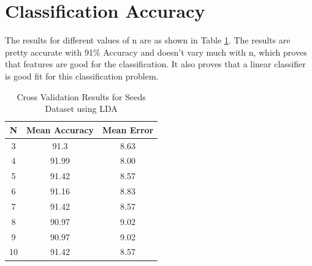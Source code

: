 \documentclass[11pt, pdftex]{article}
\begin{document}
\section{Classification Accuracy}
The results for different values of n are as shown in Table \ref{tab:seeds}. The results are pretty accurate with 91$\%$ Accuracy and doesn't vary much with n, which proves that features are good for the classification. It also proves that a linear classifier is good fit for this classification problem.
\begin{table}
\centering
\begin{tabular}{ | c | c | c |}
    \hline
    {\bf N} & {\bf Mean Accuracy} & {\bf Mean Error}\\ 
    \hline
    3 & 91.3 & 8.63\\
	\hline
	4 & 91.99 & 8.00\\
	\hline
	5 & 91.42 & 8.57\\
	\hline
	6 & 91.16 & 8.83\\
	\hline
	7 & 91.42 & 8.57\\
	\hline
	8 & 90.97 & 9.02\\
	\hline
	9 & 90.97 & 9.02\\
	\hline
	10 & 91.42 & 8.57\\
	\hline
	\end{tabular}
	\caption{Cross Validation Results for Seeds Dataset using LDA}
    \label{tab:seeds}
\end{table}
\end{document}
